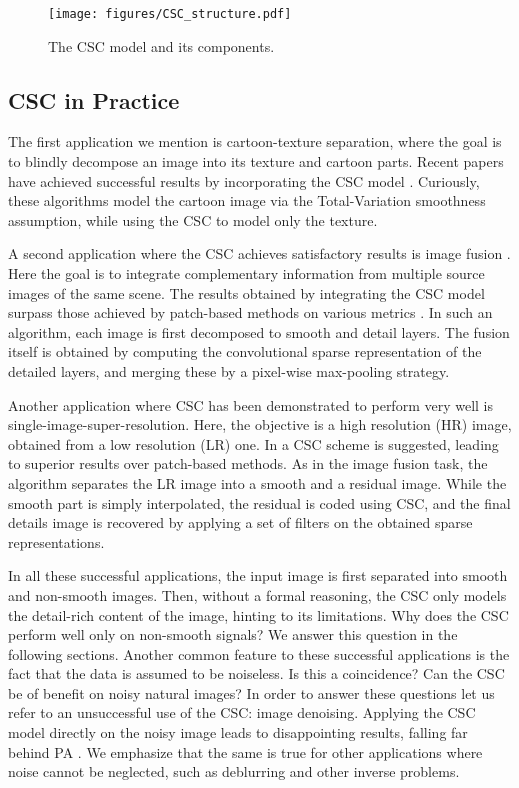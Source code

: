 \documentclass{article}
\begin{document}
\begin{figure}[t]
    \centering
    \texttt{[image: figures/CSC\_structure.pdf]}
    \caption{The CSC model and its components.}
    \label{fig:cscDefinition}
\end{figure}



\subsection{CSC in Practice}
\label{sec:uses}



The first application we mention is cartoon-texture separation, where the goal is to blindly decompose an image into its texture and cartoon parts. Recent papers have achieved successful results by incorporating the CSC model \cite{papyan2017convolutional,rey2018variations}. Curiously, these algorithms model the cartoon image via the Total-Variation smoothness assumption, while using the CSC to model only the texture.

A second application where the CSC achieves satisfactory results is image fusion \cite{liu2016image,zisselman2018local}. Here the goal is to integrate complementary information from multiple source images of the same scene. The results obtained by integrating the CSC model surpass those achieved by patch-based methods on various metrics \cite{liu2016image}. In such an algorithm, each image is first decomposed to smooth and detail layers. The fusion itself is obtained by computing the convolutional sparse representation of the detailed layers, and merging these by a pixel-wise max-pooling strategy.

Another application where CSC has been demonstrated to perform very well is single-image-super-resolution. Here, the objective is a high resolution (HR) image, obtained from a low resolution (LR) one. In \cite{gu2015convolutional} a CSC scheme is suggested, leading to superior results over patch-based methods. As in the image fusion task, the algorithm separates the LR image into a smooth and a residual image. While the smooth part is simply interpolated, the residual is coded using CSC, and the final details image is recovered by applying a set of filters on the obtained sparse representations.

In all these successful applications, the input image is first separated into smooth and non-smooth images. Then, without a formal reasoning, the CSC only models the detail-rich content of the image, hinting to its limitations. Why does the CSC perform well only on non-smooth signals? We  answer this question in the following sections. Another common feature to these successful applications is the fact that the data is assumed to be noiseless. Is this a coincidence? Can the CSC be of benefit on noisy natural images? In order to answer these questions let us refer to an unsuccessful use of the CSC: image denoising. Applying the CSC model directly on the noisy image leads to disappointing results, falling far behind PA \cite{plaut2019greedy,carrera2017sparse,wohlberg2017convolutional}. We emphasize that the same is true for other applications where noise cannot be neglected, such as deblurring and other inverse problems. 
\end{document}
